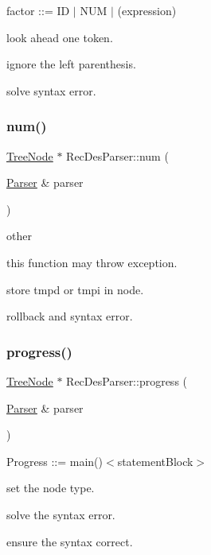 factor \+:\+:= ID $\vert$ N\+UM $\vert$ (expression) 

look ahead one token.

ignore the left parenthesis.

solve syntax error. \hypertarget{class_rec_des_parser_ab539a62bb94dce661135cebd96a45711}{}\label{class_rec_des_parser_ab539a62bb94dce661135cebd96a45711} 
\subsubsection{\texorpdfstring{num()}{num()}}
{\footnotesize\ttfamily \hyperlink{class_tree_node}{Tree\+Node} $\ast$ Rec\+Des\+Parser\+::num (\begin{DoxyParamCaption}\item[{\hyperlink{class_parser}{Parser} \&}]{parser }\end{DoxyParamCaption})\hspace{0.3cm}{\ttfamily [static]}}



other 

this function may throw exception.

store tmpd or tmpi in node.

rollback and syntax error. \hypertarget{class_rec_des_parser_ae636ed876dccbbbf0df947162017ee95}{}\label{class_rec_des_parser_ae636ed876dccbbbf0df947162017ee95} 
\subsubsection{\texorpdfstring{progress()}{progress()}}
{\footnotesize\ttfamily \hyperlink{class_tree_node}{Tree\+Node} $\ast$ Rec\+Des\+Parser\+::progress (\begin{DoxyParamCaption}\item[{\hyperlink{class_parser}{Parser} \&}]{parser }\end{DoxyParamCaption})\hspace{0.3cm}{\ttfamily [static]}}



Progress \+:\+:= main()$<$statement\+Block$>$ 

set the node type.

solve the syntax error.

ensure the syntax correct.

